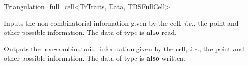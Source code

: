 \begin{ccRefClass}{Triangulation_full_cell<TrTraits, Data, TDSFullCell>}

\ccGlue{}


%
{Inputs the non-combinatorial information given by the cell, \emph{i.e.},
the point and other possible information. The data of type  is
\textbf{also} read.}

%
{Outputs the non-combinatorial information given by the cell, \emph{i.e.},
the point and other possible information. The data of type  is
\textbf{also} written.}

\ccSeeAlso


\end{ccRefClass}
